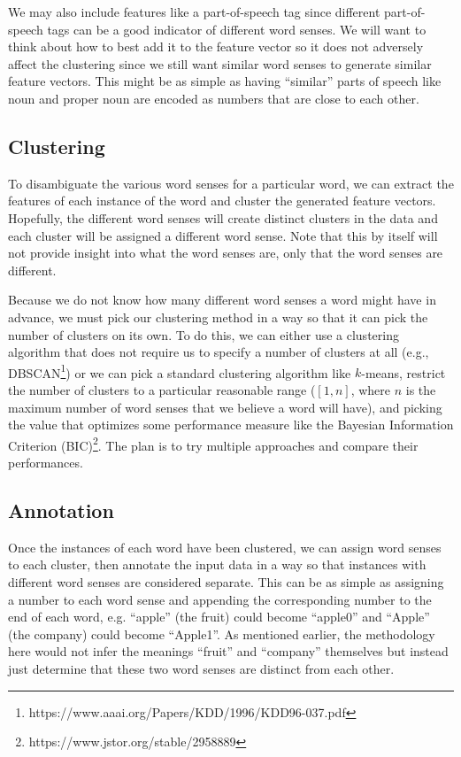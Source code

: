 \documentclass[11pt,letterpaper]{article}
\begin{document}
We may also include features like a part-of-speech tag since different part-of-speech tags can be a good indicator of different word senses. We will want to think about how to best add it to the feature vector so it does not adversely affect the clustering since we still want similar word senses to generate similar feature vectors. This might be as simple as having ``similar'' parts of speech like noun and proper noun are encoded as numbers that are close to each other.

\subsection{Clustering}
To disambiguate the various word senses for a particular word, we can extract the features of each instance of the word and cluster the generated feature vectors. Hopefully, the different word senses will create distinct clusters in the data and each cluster will be assigned a different word sense. Note that this by itself will not provide insight into what the word senses are, only that the word senses are different. 

Because we do not know how many different word senses a word might have in advance, we must pick our clustering method in a way so that it can pick the number of clusters on its own. To do this, we can either use a clustering algorithm that does not require us to specify a number of clusters at all (e.g., DBSCAN\footnote{https://www.aaai.org/Papers/KDD/1996/KDD96-037.pdf}) or we can pick a standard clustering algorithm like $k$-means, restrict the number of clusters to a particular reasonable range ($[1,n]$, where $n$ is the maximum number of word senses that we believe a word will have), and picking the value that optimizes some performance measure like the Bayesian Information Criterion (BIC)\footnote{https://www.jstor.org/stable/2958889}. The plan is to try multiple approaches and compare their performances.

\subsection{Annotation}
Once the instances of each word have been clustered, we can assign word senses to each cluster, then annotate the input data in a way so that instances with different word senses are considered separate. This can be as simple as assigning a number to each word sense and appending the corresponding number to the end of each word, e.g. ``apple'' (the fruit) could become ``apple0'' and ``Apple'' (the company) could become ``Apple1''. As mentioned earlier, the methodology here would not infer the meanings ``fruit'' and ``company'' themselves but instead just determine that these two word senses are distinct from each other.
\end{document}

